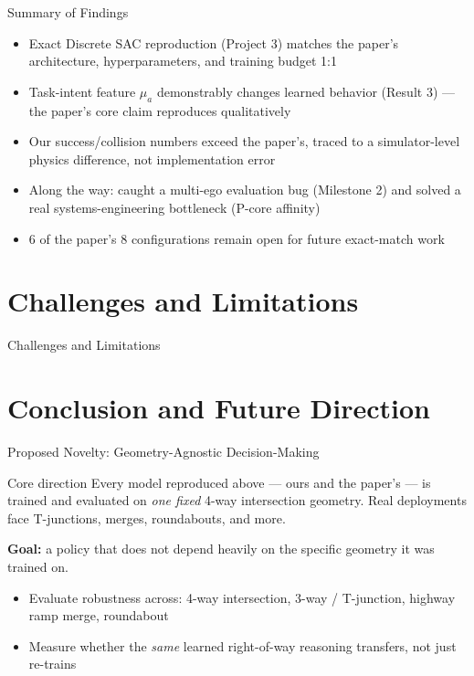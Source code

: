 \documentclass[aspectratio=169,10pt]{beamer}
\begin{document}
\begin{frame}{Summary of Findings}
    \begin{itemize}
        \item Exact Discrete SAC reproduction (Project 3) matches the paper's architecture, hyperparameters, and training budget \alert{1:1}
        \item Task-intent feature $\mu_a$ demonstrably changes learned behavior (Result 3) --- the paper's core claim reproduces qualitatively
        \item Our success/collision numbers exceed the paper's, traced to a simulator-level physics difference, not implementation error
        \item Along the way: caught a multi-ego evaluation bug (Milestone 2) and solved a real systems-engineering bottleneck (P-core affinity)
        \item 6 of the paper's 8 configurations remain open for future exact-match work
    \end{itemize}
\end{frame}

\section{Challenges and Limitations}

\begin{frame}{Challenges and Limitations}
\end{frame}

\section{Conclusion and Future Direction}

\begin{frame}{Proposed Novelty: Geometry-Agnostic Decision-Making}
    \begin{alertblock}{Core direction}
        Every model reproduced above --- ours and the paper's --- is trained and evaluated on \emph{one fixed} 4-way intersection geometry. Real deployments face T-junctions, merges, roundabouts, and more.
    \end{alertblock}
    \vspace{6pt}
    \textbf{Goal:} a policy that does not depend heavily on the specific geometry it was trained on.
    \begin{itemize}
        \item Evaluate robustness across: 4-way intersection, 3-way / T-junction, highway ramp merge, roundabout
        \item Measure whether the \emph{same} learned right-of-way reasoning transfers, not just re-trains
    \end{itemize}
\end{frame}
\end{document}

